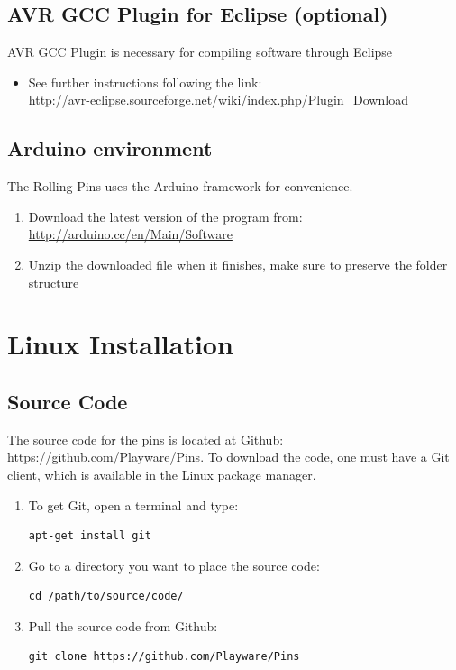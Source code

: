\documentclass[a4paper, twoside, final]{book}%
\begin{document}
\subsection*{\bf AVR GCC Plugin for Eclipse (optional)}
AVR GCC Plugin is necessary for compiling software through Eclipse
\begin{itemize}
	\item See further instructions following the link: \\
	\url{http://avr-eclipse.sourceforge.net/wiki/index.php/Plugin_Download}
\end{itemize}

\subsection*{\bf Arduino environment}
The Rolling Pins uses the Arduino framework for convenience. 
\begin{enumerate}
  \item Download the latest version of the program from: \\
  \url{http://arduino.cc/en/Main/Software}
  \item Unzip the downloaded file when it finishes, make sure to preserve the folder structure
\end{enumerate}

\newpage

\section{Linux Installation}


\subsection*{Source Code}
The source code for the pins is located at Github: \url{https://github.com/Playware/Pins}.
To download the code, one must have a Git client, which is available in the Linux package manager.

\begin{enumerate}
  \item To get Git, open a terminal and type:\\
\begin{lstlisting}
apt-get install git
\end{lstlisting}
  \item Go to a directory you want to place the source code:
    \begin{lstlisting}
cd /path/to/source/code/
    \end{lstlisting}
  \item Pull the source code from Github:\\
    \begin{lstlisting}
git clone https://github.com/Playware/Pins
    \end{lstlisting}
\end{enumerate}
\end{document}
